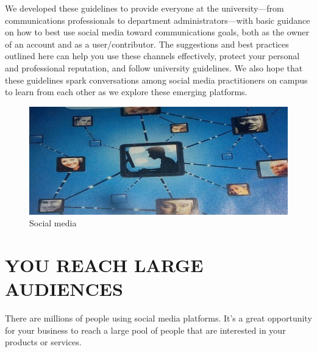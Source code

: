 \documentclass[a4paper]{article}
\begin{document}
We developed these guidelines to provide everyone at the university—from communications professionals to department administrators—with basic guidance on how to best use social media toward communications goals, both as the owner of an account and as a user/contributor. The suggestions and best practices outlined here can help you use these channels effectively, protect your personal and professional reputation, and follow university guidelines. We also hope that these guidelines spark conversations among social media practitioners on campus to learn from each other as we explore these emerging platforms.
\begin{figure}[h]
\centering
\includegraphics{dmsm}
\caption{Social media}
\end{figure}

 \cleardoublepage
  
  \tableofcontents
  \thispagestyle{empty}
  \cleardoublepage
  
  \setcounter{page}{1}  
  
  \section{ YOU REACH LARGE AUDIENCES}
There are millions of people using social media platforms. It’s a great opportunity for your business to reach a large pool of people that are interested in your products or services.
\end{document}
